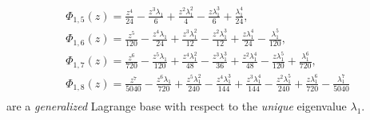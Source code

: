 \begin{remark}
\begin{equation}
\begin{array}{c}
\Phi_{ 1, 5 }{\left (z \right )} = \frac{z^{4}}{24} - \frac{z^{3} \lambda_{1}}{6} + \frac{z^{2} \lambda_{1}^{2}}{4} - \frac{z \lambda_{1}^{3}}{6} + \frac{\lambda_{1}^{4}}{24}, \\ 
\Phi_{ 1, 6 }{\left (z \right )} = \frac{z^{5}}{120} - \frac{z^{4} \lambda_{1}}{24} + \frac{z^{3} \lambda_{1}^{2}}{12} - \frac{z^{2} \lambda_{1}^{3}}{12} + \frac{z \lambda_{1}^{4}}{24} - \frac{\lambda_{1}^{5}}{120}, \\
\Phi_{ 1, 7 }{\left (z \right )} = \frac{z^{6}}{720} - \frac{z^{5} \lambda_{1}}{120} + \frac{z^{4} \lambda_{1}^{2}}{48} - \frac{z^{3} \lambda_{1}^{3}}{36} + \frac{z^{2} \lambda_{1}^{4}}{48} - \frac{z \lambda_{1}^{5}}{120} + \frac{\lambda_{1}^{6}}{720}, \\ 
\Phi_{ 1, 8 }{\left (z \right )} = \frac{z^{7}}{5040} - \frac{z^{6} \lambda_{1}}{720} + \frac{z^{5} \lambda_{1}^{2}}{240} - \frac{z^{4} \lambda_{1}^{3}}{144} + \frac{z^{3} \lambda_{1}^{4}}{144} - \frac{z^{2} \lambda_{1}^{5}}{240} + \frac{z \lambda_{1}^{6}}{720} - \frac{\lambda_{1}^{7}}{5040}\\
\end{array}
\label{eq:generalized-Lagrange-base}
\end{equation}
are a \textit{generalized} Lagrange base with respect to the \textit{unique}
eigenvalue $\lambda_{1}$.
\end{remark}
